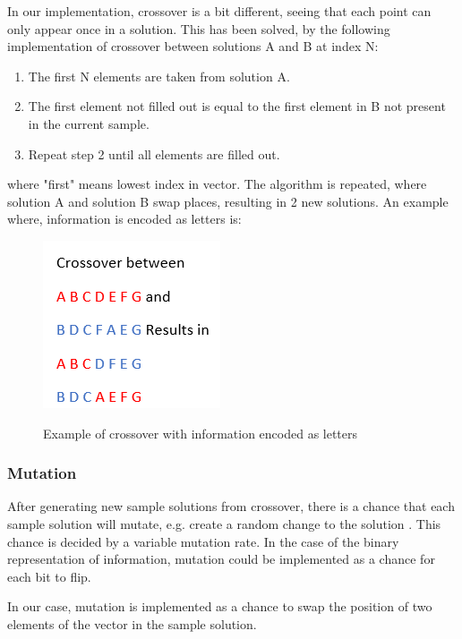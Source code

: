 In our implementation, crossover is a bit different, seeing that each point can only appear once in a solution. This has been solved, by the following implementation of crossover between solutions A and B at index N:
\begin{enumerate}
	\item The first N elements are taken from solution A.
	\item The first element not filled out is equal to the first element in B not present in the current sample.
	\item Repeat step 2 until all elements are filled out.
\end{enumerate}

where "first" means lowest index in vector. The algorithm is repeated, where solution A and solution B swap places, resulting in 2 new solutions. An example where, information is encoded as letters is:

\begin{figure}[h]
	\centering
	{\includegraphics[scale=0.5]{Images/crossover_letters.PNG}}\\[0.5cm]
	\caption{Example of crossover with information encoded as letters}
	\label{fig:crossover_letters}
\end{figure}

\FloatBarrier

\subsubsection{Mutation}
After generating new sample solutions from crossover, there is a chance that each sample solution will mutate, e.g. create a random change to the solution . This chance is decided by a variable mutation rate. In the case of the binary representation of information, mutation could be implemented as a chance for each bit to flip.

In our case, mutation is implemented as a chance to swap the position of two elements of the vector in the sample solution. 

